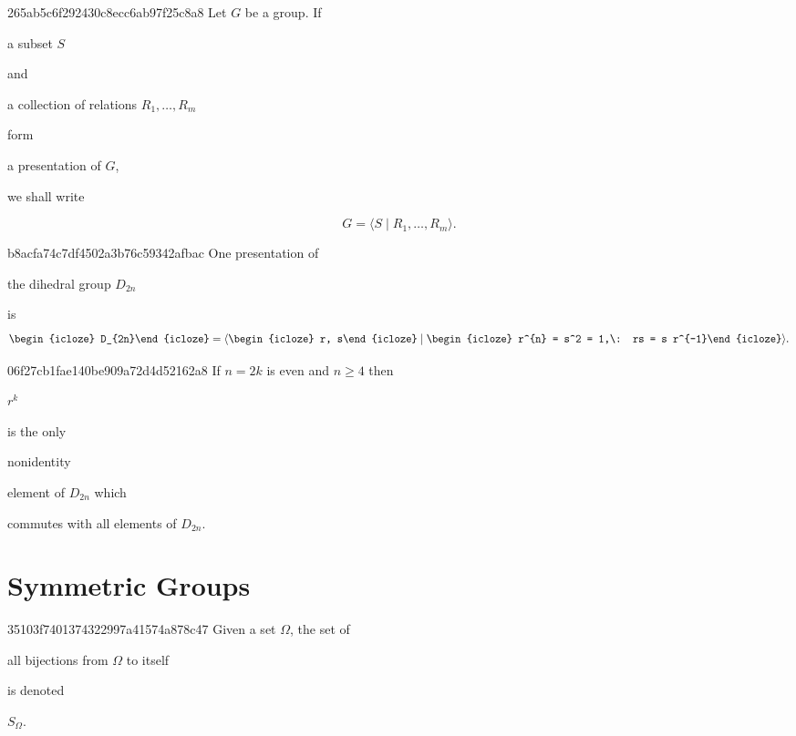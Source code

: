 \begin{note}{265ab5c6f292430c8ecc6ab97f25c8a8}
    Let \({ G }\) be a group. If \begin{icloze}{4}a subset \({ S }\)\end{icloze} and \begin{icloze}{3}a collection of relations \({ R_1, \ldots, R_{m} }\)\end{icloze} form \begin{icloze}{2}a presentation of \({ G }\),\end{icloze} we shall write
    \begin{icloze}{1}
        \[
            G = \langle S \mid R_1, \ldots, R_{m} \rangle.
        \]
    \end{icloze}
\end{note}

\begin{note}{b8acfa74c7df4502a3b76c59342afbac}
    One presentation of \begin{icloze}{3}the dihedral group \({ D_{2n} }\)\end{icloze} is
    \[
        \begin{icloze}{3}D_{2n}\end{icloze} = \langle \begin{icloze}{2}r, s\end{icloze} \mid \begin{icloze}{1}r^{n} = s^2 = 1,\: rs = s r^{-1}\end{icloze} \rangle.
    \]
\end{note}

\begin{note}{06f27cb1fae140be909a72d4d52162a8}
    If \({ n = 2k }\) is even and \({ n \geq 4 }\) then \begin{icloze}{3}\({ r^{k} }\)\end{icloze} is the only \begin{icloze}{2}nonidentity\end{icloze} element of \({ D_{2n} }\) which \begin{icloze}{1}commutes with all elements of \({ D_{2n} }\).\end{icloze}
\end{note}

\section{Symmetric Groups}
\begin{note}{35103f7401374322997a41574a878c47}
    Given a set \({ \Omega }\), the set of \begin{icloze}{1}all bijections from \({ \Omega }\) to itself\end{icloze} is denoted \begin{icloze}{2}\({ S_{\Omega} }\).\end{icloze}
\end{note}

